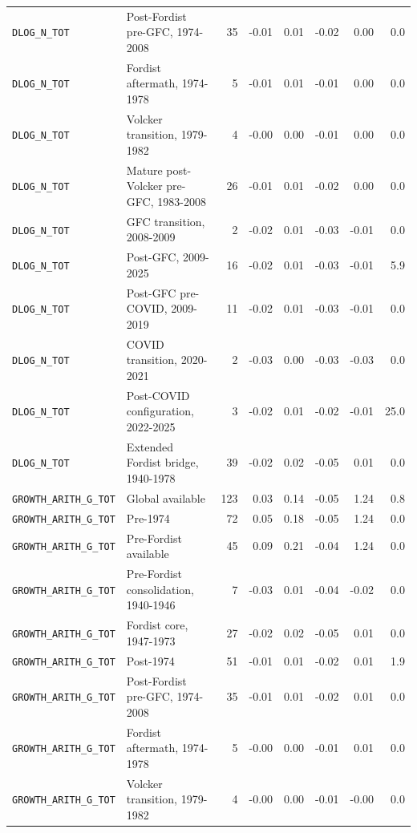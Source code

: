 \begin{landscape}
\begin{longtable}{p{4.4cm}p{3.8cm}rrrrrr}
\nolinkurl{DLOG_N_TOT} & Post-Fordist pre-GFC, 1974-2008 & 35 & -0.01 & 0.01 & -0.02 & 0.00 & 0.0
\\
\nolinkurl{DLOG_N_TOT} & Fordist aftermath, 1974-1978 & 5 & -0.01 & 0.01 & -0.01 & 0.00 & 0.0
\\
\nolinkurl{DLOG_N_TOT} & Volcker transition, 1979-1982 & 4 & -0.00 & 0.00 & -0.01 & 0.00 & 0.0
\\
\nolinkurl{DLOG_N_TOT} & Mature post-Volcker pre-GFC, 1983-2008 & 26 & -0.01 & 0.01 & -0.02 & 0.00 & 0.0
\\
\nolinkurl{DLOG_N_TOT} & GFC transition, 2008-2009 & 2 & -0.02 & 0.01 & -0.03 & -0.01 & 0.0
\\
\nolinkurl{DLOG_N_TOT} & Post-GFC, 2009-2025 & 16 & -0.02 & 0.01 & -0.03 & -0.01 & 5.9
\\
\nolinkurl{DLOG_N_TOT} & Post-GFC pre-COVID, 2009-2019 & 11 & -0.02 & 0.01 & -0.03 & -0.01 & 0.0
\\
\nolinkurl{DLOG_N_TOT} & COVID transition, 2020-2021 & 2 & -0.03 & 0.00 & -0.03 & -0.03 & 0.0
\\
\nolinkurl{DLOG_N_TOT} & Post-COVID configuration, 2022-2025 & 3 & -0.02 & 0.01 & -0.02 & -0.01 & 25.0
\\
\nolinkurl{DLOG_N_TOT} & Extended Fordist bridge, 1940-1978 & 39 & -0.02 & 0.02 & -0.05 & 0.01 & 0.0
\\
\nolinkurl{GROWTH_ARITH_G_TOT} & Global available & 123 & 0.03 & 0.14 & -0.05 & 1.24 & 0.8
\\
\nolinkurl{GROWTH_ARITH_G_TOT} & Pre-1974 & 72 & 0.05 & 0.18 & -0.05 & 1.24 & 0.0
\\
\nolinkurl{GROWTH_ARITH_G_TOT} & Pre-Fordist available & 45 & 0.09 & 0.21 & -0.04 & 1.24 & 0.0
\\
\nolinkurl{GROWTH_ARITH_G_TOT} & Pre-Fordist consolidation, 1940-1946 & 7 & -0.03 & 0.01 & -0.04 & -0.02 & 0.0
\\
\nolinkurl{GROWTH_ARITH_G_TOT} & Fordist core, 1947-1973 & 27 & -0.02 & 0.02 & -0.05 & 0.01 & 0.0
\\
\nolinkurl{GROWTH_ARITH_G_TOT} & Post-1974 & 51 & -0.01 & 0.01 & -0.02 & 0.01 & 1.9
\\
\nolinkurl{GROWTH_ARITH_G_TOT} & Post-Fordist pre-GFC, 1974-2008 & 35 & -0.01 & 0.01 & -0.02 & 0.01 & 0.0
\\
\nolinkurl{GROWTH_ARITH_G_TOT} & Fordist aftermath, 1974-1978 & 5 & -0.00 & 0.00 & -0.01 & 0.01 & 0.0
\\
\nolinkurl{GROWTH_ARITH_G_TOT} & Volcker transition, 1979-1982 & 4 & -0.00 & 0.00 & -0.01 & -0.00 & 0.0

\end{longtable}
\end{landscape}

